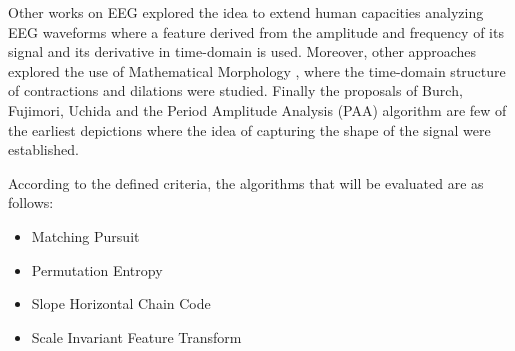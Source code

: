 \documentclass[brainsci,article,submit,moreauthors,pdftex,10pt,a4paper]{mdpi}
\begin{document}
Other works on EEG explored the idea to extend human capacities analyzing EEG waveforms \citep{Klein1976} where a feature derived from the amplitude and frequency of its signal and its derivative in time-domain is used.  Moreover, other approaches explored the use of Mathematical Morphology \citep{Yamaguchi2009}, where the time-domain structure of contractions and dilations were studied. Finally the proposals of Burch, Fujimori, Uchida and the Period Amplitude Analysis (PAA) \citep{Uchida1996} algorithm are few of the earliest depictions where the idea of capturing the shape of the signal were established.



%
%
%
%
%
%
%
%
%
%

According to the defined criteria, the algorithms that will be evaluated are as follows:

\begin{itemize}
\item Matching Pursuit
\item Permutation Entropy
\item Slope Horizontal Chain Code
\item Scale Invariant Feature Transform
\end{itemize}
\end{document}
